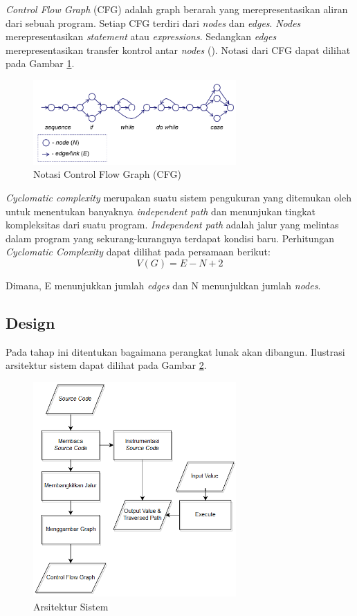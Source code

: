 \textit{Control Flow Graph }(CFG) adalah graph berarah yang merepresentasikan aliran dari sebuah program. Setiap CFG terdiri dari \textit{nodes} dan \textit{edges}. \textit{Nodes} merepresentasikan \textit{statement} atau \textit{expressions}. Sedangkan \textit{edges} merepresentasikan transfer kontrol antar \textit{nodes} (\cite{MCCABE}). Notasi dari CFG dapat dilihat pada Gambar \ref{fig:cfg}.
\begin{figure}[h]
	\centering
	\includegraphics[width=220pt]{gambar/CFG2}
	\caption{Notasi Control Flow Graph (CFG)}
	\label{fig:cfg}
\end{figure}

\textit{Cyclomatic complexity} merupakan suatu sistem pengukuran yang ditemukan oleh \citeauthor{MCCABE} untuk menentukan banyaknya \textit{independent path} dan menunjukan tingkat kompleksitas dari suatu program. \textit{Independent path} adalah jalur yang melintas dalam program yang sekurang-kurangnya terdapat kondisi baru. Perhitungan \textit{Cyclomatic Complexity} dapat dilihat pada persamaan berikut:
\[V(G)=E-N+2\]

Dimana, E menunjukkan jumlah \textit{edges} dan N menunjukkan jumlah \textit{nodes}.

\subsection*{Design}
Pada tahap ini ditentukan bagaimana perangkat lunak akan dibangun. Ilustrasi arsitektur sistem dapat dilihat pada Gambar \ref{fig:struktur}.
\begin{figure}[h!]
	\centering
	\includegraphics[width=220pt]{gambar/struktur}
	\caption{Arsitektur Sistem}
	\label{fig:struktur}
\end{figure}

